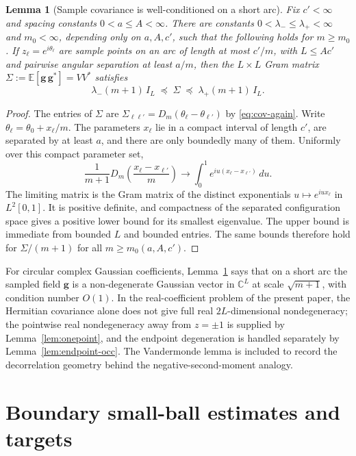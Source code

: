 \documentclass[11pt]{amsart}
\numberwithin{equation}{section}
\newtheorem{lemma}[theorem]{Lemma}
\theoremstyle{definition}
\theoremstyle{remark}
\newcommand{\C}{\mathbb C}
\newcommand{\Exp}{\mathbb E}
\newcommand{\Id}{I}
\begin{document}
\begin{lemma}[Sample covariance is well-conditioned on a short arc]\label{lem:vander}
Fix \(c'<\infty\) and spacing constants \(0<a\le A<\infty\).  There are constants \(0<\lambda_-\le\lambda_+<\infty\) and \(m_0<\infty\), depending only on \(a,A,c'\), such that the following holds for \(m\ge m_0\).  If \(z_\ell=e^{i\theta_\ell}\) are sample points on an arc of length at most \(c'/m\), with \(L\le A c'\) and pairwise angular separation at least \(a/m\), then the \(L\times L\) Gram matrix \(\Sigma:=\Exp[\mathbf g\,\mathbf g^*]=VV^*\) satisfies
\begin{equation}\label{eq:vander}
  \lambda_-(m+1)\,\Id_L\;\preceq\;\Sigma\;\preceq\;\lambda_+(m+1)\,\Id_L.
\end{equation}
\end{lemma}

\begin{proof}
The entries of $\Sigma$ are $\Sigma_{\ell\ell'}=D_m(\theta_\ell-\theta_{\ell'})$ by \eqref{eq:cov-again}.  Write \(\theta_\ell=\theta_0+x_\ell/m\).  The parameters \(x_\ell\) lie in a compact interval of length \(c'\), are separated by at least \(a\), and there are only boundedly many of them.  Uniformly over this compact parameter set,
\[
  \frac{1}{m+1}D_m\!\left(\frac{x_\ell-x_{\ell'}}{m}\right)
  \longrightarrow
  \int_0^1 e^{iu(x_\ell-x_{\ell'})}\,du .
\]
The limiting matrix is the Gram matrix of the distinct exponentials \(u\mapsto e^{iux_\ell}\) in \(L^2[0,1]\).  It is positive definite, and compactness of the separated configuration space gives a positive lower bound for its smallest eigenvalue.  The upper bound is immediate from bounded \(L\) and bounded entries.  The same bounds therefore hold for \(\Sigma/(m+1)\) for all \(m\ge m_0(a,A,c')\).
\end{proof}

For circular complex Gaussian coefficients, Lemma~\ref{lem:vander} says that on a short arc the sampled field $\mathbf g$ is a non-degenerate Gaussian vector in $\C^L$ at scale $\sqrt{m+1}$, with condition number $O(1)$.  In the real-coefficient problem of the present paper, the Hermitian covariance alone does not give full real \(2L\)-dimensional nondegeneracy; the pointwise real nondegeneracy away from \(z=\pm1\) is supplied by Lemma~\ref{lem:onepoint}, and the endpoint degeneration is handled separately by Lemma~\ref{lem:endpoint-occ}.  The Vandermonde lemma is included to record the decorrelation geometry behind the negative-second-moment analogy.

\section{Boundary small-ball estimates and targets}\label{sec:smallball}
\end{document}
